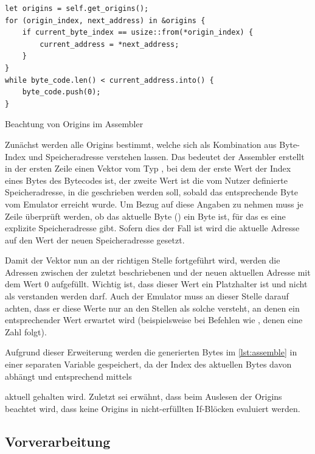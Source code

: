 \begin{listing}[th]
\begin{verbatim}
let origins = self.get_origins();
for (origin_index, next_address) in &origins {
	if current_byte_index == usize::from(*origin_index) {
        current_address = *next_address;
    }
}
while byte_code.len() < current_address.into() {
    byte_code.push(0);
}
\end{verbatim}
\caption{Beachtung von Origins im Assembler}
\label{lst:ass:origins}
\end{listing}

Zunächst werden alle Origins bestimmt, welche sich als Kombination aus Byte-Index und Speicheradresse verstehen lassen. Das bedeutet der Assembler erstellt in der ersten Zeile einen Vektor vom Typ , bei dem der erste Wert der Index eines Bytes des Bytecodes ist, der zweite Wert ist die vom Nutzer definierte Speicheradresse, in die geschrieben werden soll, sobald das entsprechende Byte vom Emulator erreicht wurde. Um Bezug auf diese Angaben zu nehmen muss je Zeile überprüft werden, ob das aktuelle Byte () ein Byte ist, für das es eine explizite Speicheradresse gibt. Sofern dies der Fall ist wird die aktuelle Adresse auf den Wert der neuen Speicheradresse gesetzt. 

Damit der Vektor nun an der richtigen Stelle fortgeführt wird, werden die Adressen zwischen der zuletzt beschriebenen und der neuen aktuellen Adresse mit dem Wert 0 aufgefüllt. Wichtig ist, dass dieser Wert ein Platzhalter ist und nicht als \grqq{} verstanden werden darf. Auch der Emulator muss an dieser Stelle darauf achten, dass er diese Werte nur an den Stellen als solche versteht, an denen ein entsprechender Wert erwartet wird (beispielsweise bei Befehlen wie , denen eine Zahl folgt).

Aufgrund dieser Erweiterung werden die generierten Bytes im \cref{lst:assemble} in einer separaten Variable gespeichert, da der Index des aktuellen Bytes davon abhängt und entsprechend mittels

\qquad {}

aktuell gehalten wird. Zuletzt sei erwähnt, dass beim Auslesen der Origins beachtet wird, dass keine Origins in nicht-erfüllten If-Blöcken evaluiert werden.

\subsection{Vorverarbeitung}\label{chap:preprocessor}

